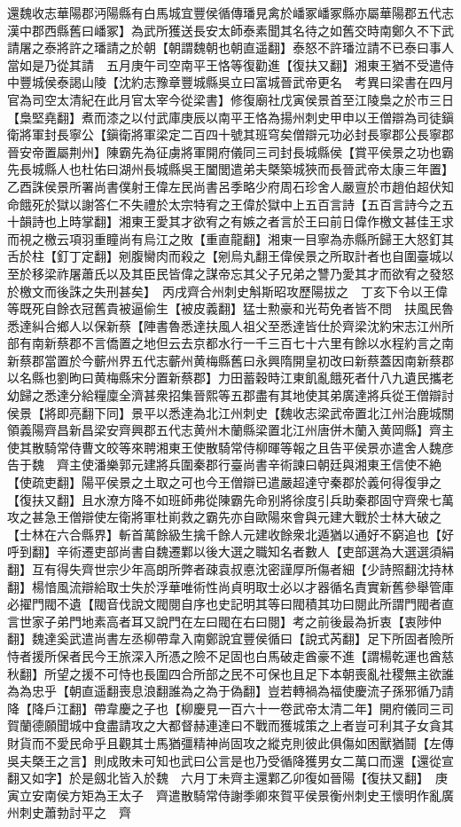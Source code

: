 還魏收志華陽郡沔陽縣有白馬城宜豐侯循傳璠見禽於嶓冢嶓冢縣亦屬華陽郡五代志漢中郡西縣舊曰嶓冢】為武所獲送長安太師泰素聞其名待之如舊交時南鄭久不下武請屠之泰將許之璠請之於朝【朝謂魏朝也朝直遥翻】泰怒不許璠泣請不已泰曰事人當如是乃從其請　五月庚午司空南平王恪等復勸進【復扶又翻】湘東王猶不受遣侍中豐城侯泰謁山陵【沈約志豫章豐城縣吳立曰富城晉武帝更名　考異曰梁書在四月官為司空太清紀在此月官太宰今從梁書】修復廟社戊寅侯景首至江陵梟之於市三日【梟堅堯翻】煮而漆之以付武庫庚辰以南平王恪為揚州刺史甲申以王僧辯為司徒鎭衛將軍封長寧公【鎭衛將軍梁定二百四十號其班穹矣僧辯元功必封長寧郡公長寧郡晉安帝置屬荆州】陳霸先為征虜將軍開府儀同三司封長城縣侯【賞平侯景之功也霸先長城縣人也杜佑曰湖州長城縣吳王闔閭遣弟夫槩築城狹而長晉武帝太康三年置】乙酉誅侯景所署尚書僕射王偉左民尚書呂季略少府周石珍舍人嚴亶於市趙伯超伏知命餓死於獄以謝答仁不失禮於太宗特宥之王偉於獄中上五百言詩【五百言詩今之五十韻詩也上時掌翻】湘東王愛其才欲宥之有嫉之者言於王曰前日偉作檄文甚佳王求而視之檄云項羽重瞳尚有烏江之敗【重直龍翻】湘東一目寧為赤縣所歸王大怒釘其舌於柱【釘丁定翻】剜腹臠肉而殺之【剜烏丸翻王偉侯景之所取計者也自圍臺城以至於移梁祚屠蕭氏以及其臣民皆偉之謀帝忘其父子兄弟之讐乃愛其才而欲宥之發怒於檄文而後誅之失刑甚矣】　丙戌齊合州刺史斛斯昭攻歷陽拔之　丁亥下令以王偉等既死自餘衣冠舊貴被逼偷生【被皮義翻】猛士勲豪和光苟免者皆不問　扶風民魯悉達糾合鄉人以保新蔡【陣書魯悉達扶風人祖父至悉達皆仕於齊梁沈約宋志江州所部有南新蔡郡不言僑置之地但云去京都水行一千三百七十六里有餘以水程約言之南新蔡郡當置於今蘄州界五代志蘄州黄梅縣舊曰永興隋開皇初改曰新蔡蓋因南新蔡郡以名縣也劉昫曰黄梅縣宋分置新蔡郡】力田蓄穀時江東飢亂餓死者什八九遺民攜老幼歸之悉達分給糧廩全濟甚衆招集晉熙等五郡盡有其地使其弟廣達將兵從王僧辯討侯景【將即亮翻下同】景平以悉達為北江州刺史【魏收志梁武帝置北江州治鹿城關領義陽齊昌新昌梁安齊興郡五代志黄州木蘭縣梁置北江州唐併木蘭入黄岡縣】齊主使其散騎常侍曹文皎等來聘湘東王使散騎常侍柳暉等報之且告平侯景亦遣舍人魏彦告于魏　齊主使潘樂郭元建將兵圍秦郡行臺尚書辛術諫曰朝廷與湘東王信使不絶【使疏吏翻】陽平侯景之土取之可也今王僧辯已遣嚴超達守秦郡於義何得復爭之【復扶又翻】且水潦方降不如班師弗從陳霸先命别將徐度引兵助秦郡固守齊衆七萬攻之甚急王僧辯使左衛將軍杜崱救之霸先亦自歐陽來會與元建大戰於士林大破之【士林在六合縣界】斬首萬餘級生擒千餘人元建收餘衆北遁猶以通好不窮追也【好呼到翻】辛術遷吏部尚書自魏遷鄴以後大選之職知名者數人【吏部選為大選選須絹翻】互有得失齊世宗少年高朗所弊者疎袁叔悳沈密謹厚所傷者細【少詩照翻沈持林翻】楊愔風流辯給取士失於浮華唯術性尚貞明取士必以才器循名責實新舊參舉管庫必擢門閥不遺【閥音伐說文閥閱自序也史記明其等曰閥積其功曰閱此所謂門閥者直言世家子弟門地素高者耳又說門在左曰閥在右曰閱】考之前後最為折衷【衷陟仲翻】魏達奚武遣尚書左丞柳帶韋入南鄭說宜豐侯循曰【說式芮翻】足下所固者險所恃者援所保者民今王旅深入所憑之險不足固也白馬破走酋豪不進【謂楊乾運也酋慈秋翻】所望之援不可恃也長圍四合所部之民不可保也且足下本朝喪亂社稷無主欲誰為為忠乎【朝直遥翻喪息浪翻誰為之為于偽翻】豈若轉禍為福使慶流子孫邪循乃請降【降戶江翻】帶韋慶之子也【柳慶見一百六十一卷武帝太清二年】開府儀同三司賀蘭德願聞城中食盡請攻之大都督赫連達曰不戰而獲城策之上者豈可利其子女貪其財貨而不愛民命乎且觀其士馬猶彊精神尚固攻之縱克則彼此俱傷如困獸猶鬪【左傳吳夫槩王之言】則成敗未可知也武曰公言是也乃受循降獲男女二萬口而還【還從宣翻又如字】於是劔北皆入於魏　六月丁未齊主還鄴乙卯復如晉陽【復扶又翻】　庚寅立安南侯方矩為王太子　齊遣散騎常侍謝季卿來賀平侯景衡州刺史王懷明作亂廣州刺史蕭勃討平之　齊


